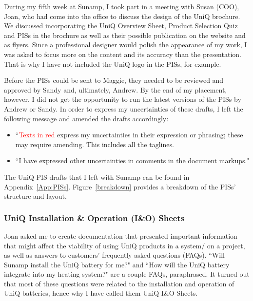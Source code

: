 During my fifth week at Sunamp, I took part in a meeting with Susan (COO), Joan, 
who had come into the office to discuss the design of the UniQ brochure.
We discussed incorporating the UniQ Overview Sheet, Product Selection Quiz and PISs in the brochure as well as their possible publication on the website and as flyers.
Since a professional designer would polish the appearance of my work, I was asked to focus more on the content and its accuracy than the presentation.
That is why I have not included the UniQ logo in the PISs, for example.

Before the PISs could be sent to Maggie, they needed to be reviewed and approved by Sandy and, ultimately, Andrew.
By the end of my placement, however, I did not get the opportunity to run the latest versions of the PISs by Andrew or Sandy.
In order to express my uncertainties of these drafts, I left the following message and amended the drafts accordingly:
\begin{itemize}
    \item ``\textcolor{red}{Texts in red} express my uncertainties in their expression or phrasing; these may require amending. This includes all the taglines.
    \item ``I have expressed other uncertainties in comments in the document markups."
\end{itemize}

The UniQ PIS drafts that I left with Sunamp can be found in Appendix~\ref{App:PISs}.
Figure~\ref{breakdown} provides a breakdown of the PISs' structure and layout.



\subsubsection{UniQ Installation \& Operation (I\&O) Sheets}

Joan asked me to create documentation that presented important information that might affect the viability of using UniQ products in a system/ on a project, as well as answers to customers' frequently asked questions (FAQs).
``Will Sunamp install the UniQ battery for me?" and ``How will the UniQ battery integrate into my heating system?" are a couple FAQs, paraphrased.
It turned out that most of these questions were related to the installation and operation of UniQ batteries, hence why I have called them UniQ I\&O Sheets.

